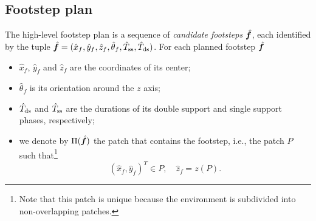 

\subsection{Footstep plan}

The high-level footstep plan is a sequence of {\em candidate footsteps} $\hat{{\bm{f}}}$, each identified by the tuple $\hat{{\bm{f}}} = (\hat x_f, \hat y_f, \hat z_f, \hat\theta_f, \hat T_{\rm ss}, \hat T_{\rm ds})$. For each planned footstep $\hat{{\bm{f}}}$

\begin{itemize}
\item $\hat x_f$, $\hat y_f$ and $\hat z_f$ are the coordinates of its center;
\item $\hat\theta_f$ is its orientation around the $z$ axis;
\item $\hat T_{\rm ds}$ and $\hat T_{\rm ss}$ are the durations of its  double support and single support phases, respectively;
\item we denote by $\Pi(\hat{{\bm{f}}})$ the patch that contains the footstep, i.e., the patch $P$ such that\footnote{Note that this patch is unique because the environment is subdivided into non-overlapping patches.}
\[
(\hat{x}_f, \hat{y}_f)^T \in P,\quad \hat{z}_f = z(P).
\]
\end{itemize}


